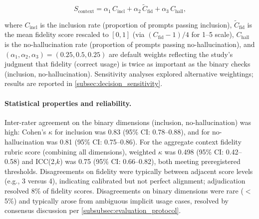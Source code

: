 \[
S_{\text{context}} = \alpha_1 \, C_{\text{incl}} + \alpha_2 \, \tilde{C}_{\text{fid}} + \alpha_3 \, C_{\text{hall}},
\]

where $C_{\text{incl}}$ is the inclusion rate (proportion of prompts passing inclusion), $\tilde{C}_{\text{fid}}$ is the mean fidelity score rescaled to $[0,1]$ (via $(C_{\text{fid}} - 1)/4$ for 1--5 scale), $C_{\text{hall}}$ is the no-hallucination rate (proportion of prompts passing no-hallucination), and $(\alpha_1, \alpha_2, \alpha_3) = (0.25, 0.5, 0.25)$ are default weights reflecting the study's judgment that fidelity (correct usage) is twice as important as the binary checks (inclusion, no-hallucination). Sensitivity analyses explored alternative weightings; results are reported in \cref{subsec:decision_sensitivity}.

\paragraph{Statistical properties and reliability.} Inter-rater agreement on the binary dimensions (inclusion, no-hallucination) was high: Cohen's $\kappa$ for inclusion was 0.83 (95\% CI: 0.78--0.88), and for no-hallucination was 0.81 (95\% CI: 0.75--0.86). For the aggregate context fidelity rubric score (combining all dimensions), weighted $\kappa$ was 0.498 (95\% CI: 0.42--0.58) and ICC(2,$k$) was 0.75 (95\% CI: 0.66--0.82), both meeting preregistered thresholds. Disagreements on fidelity were typically between adjacent score levels (e.g., 3 versus 4), indicating calibrated but not perfect alignment; adjudication resolved 8\% of fidelity scores. Disagreements on binary dimensions were rare ($<$5\%) and typically arose from ambiguous implicit usage cases, resolved by consensus discussion per \cref{subsubsec:evaluation_protocol}.

